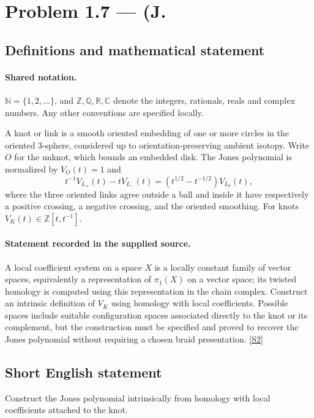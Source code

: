 \documentclass[11pt]{article}
\newcommand{\sref}[2]{\hyperlink{source:#1:#2}{[S#2]}}
\begin{document}
\section{Problem 1.7 — (J.}\label{statement}

\subsection{Definitions and mathematical statement}

\paragraph{Shared notation.}$\mathbb N=\{1,2,\ldots\}$, and $\mathbb Z,\mathbb Q,\mathbb R,\mathbb C$ denote the integers, rationals, reals and complex numbers. Any other conventions are specified locally.


A knot or link is a smooth oriented embedding of one or more circles in the oriented $3$-sphere, considered up to orientation-preserving ambient isotopy. Write $O$ for the unknot, which bounds an embedded disk. The Jones polynomial is normalized by $V_O(t)=1$ and
\[t^{-1}V_{L_+}(t)-tV_{L_-}(t)=(t^{1/2}-t^{-1/2})V_{L_0}(t),\]
where the three oriented links agree outside a ball and inside it have respectively a positive crossing, a negative crossing, and the oriented smoothing. For knots $V_K(t)\in\mathbb Z[t,t^{-1}]$.
\paragraph{Statement recorded in the supplied source.}
A local coefficient system on a space $X$ is a locally constant family of vector spaces, equivalently a representation of $\pi_1(X)$ on a vector space; its twisted homology is computed using this representation in the chain complex. Construct an intrinsic definition of $V_K$ using homology with local coefficients. Possible spaces include suitable configuration spaces associated directly to the knot or its complement, but the construction must be specified and proved to recover the Jones polynomial without requiring a chosen braid presentation. \sref{statement}{2}
\subsection{Short English statement}
Construct the Jones polynomial intrinsically from homology with local coefficients attached to the knot.
\end{document}
